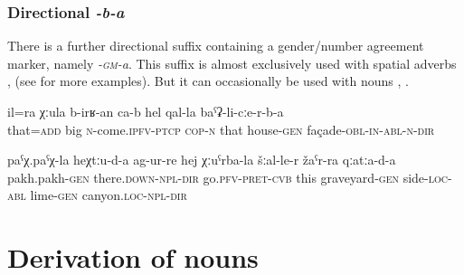 
\subsubsection{Directional \textit{-b-a}}
\label{sssec:Directional -gm-a}

There is a further directional suffix containing a gender/number agreement marker, namely \textit{-\textsc{gm}-a}. This suffix is almost exclusively used with spatial adverbs ,  (see  for more examples). But it can occasionally be used with nouns , .
%
\begin{exe}
	\ex	\label{This is also growing along the façade of the house}
	\gll	il=ra	χːula	b-irʁ-an ca-b	hel	qal-la	baˁʡ-li-cːe-r-b-a\\
		that=\textsc{add}	big	\textsc{n}-come.\textsc{ipfv}-\textsc{ptcp} \textsc{cop-n}	that	house-\textsc{gen}	façade-\textsc{obl-in}-\textsc{abl}-\textsc{n}-\textsc{dir}\\
	\glt	{}
	
	\ex	\label{They went in the direction of pakh-pakh (microtoponym), across the side of the graveyard,}
	\gll	paˁχ.paˁχ-la	heχtːu-d-a	ag-ur-re	hej	χːuˁrba-la	šːal-le-r žaˁr-ra	qːatːa-d-a \\
		pakh.pakh-\textsc{gen}	there.\textsc{down-npl}-\textsc{dir}	go.\textsc{pfv}-\textsc{pret}-\textsc{cvb}	this	graveyard-\textsc{gen}	side-\textsc{loc}-\textsc{abl}	lime-\textsc{gen}	canyon.\textsc{loc}-\textsc{npl}-\textsc{dir}\\
	\glt	{}
\end{exe}



\section{Derivation of nouns}
\label{sec:nounderivation}



